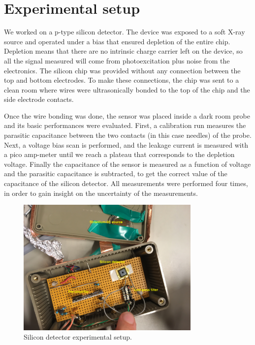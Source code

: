 \documentclass[12pt]{article}
\begin{document}
%
%

\section{Experimental setup}

We worked on a p-type silicon detector. The device was exposed to a soft X-ray source and operated under a bias that ensured depletion of the entire chip. Depletion means that there are no intrinsic charge carrier left on the device, so all the signal measured will come from photoexcitation plus noise from the electronics. The silicon chip was provided without any connection between the top and bottom electrodes. To make these connections, the chip was sent to a clean room where wires were ultrasonically bonded to the top of the chip and the side electrode contacts.

Once the wire bonding was done, the sensor was placed inside a dark room probe and its basic performances were evaluated. First, a calibration run measures the parasitic capacitance between the two contacts (in this case needles) of the probe. Next, a voltage bias scan is performed, and the leakage current is measured with a pico amp-meter until we reach a plateau that corresponds to the depletion voltage. Finally the capacitance of the sensor is measured as a function of voltage and the parasitic capacitance is subtracted, to get the correct value of the capacitance of the silicon detector. All measurements were performed four times, in order to gain insight on the uncertainty of the measurements.

\begin{figure}[htb]
  \centering
  \includegraphics[width=0.8\textwidth]{./graphics/experimentalSetup}
  \caption{Silicon detector experimental setup.}
  \label{fig:ExperimentalSetup}
\end{figure}
\end{document}
